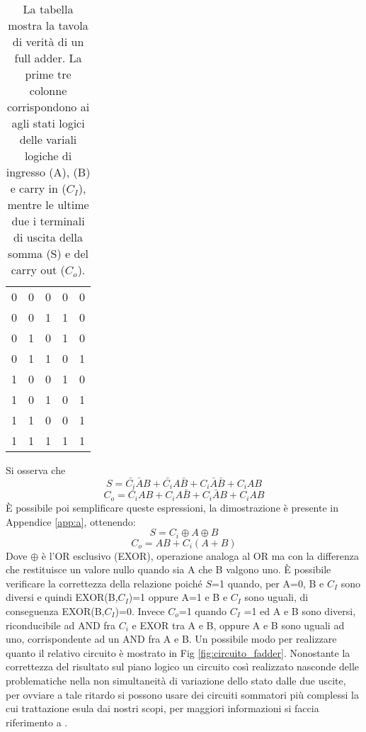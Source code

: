 \documentclass[a4paper,11pt]{article}
\begin{document}
	\begin{table}[h!]
		\centering
		\centering
		\begin{tabular}{|c|c|c|c|c|}
			\hline
			\cellcolor{yellow} \text{A} & \cellcolor{yellow} \text{B} & \cellcolor{yellow} \text{$C_I$} & \cellcolor{yellow} \text{$S$} & \cellcolor{yellow} \text{$C_o$} \\
			\hline
			0 & 0 & 0 & 0 & 0 \\
			0 & 0 & 1 & 1 & 0 \\
			0 & 1 & 0 & 1 & 0 \\
			0 & 1 & 1 & 0 & 1 \\
			1 & 0 & 0 & 1 & 0 \\
			1 & 0 & 1 & 0 & 1 \\
			1 & 1 & 0 & 0 & 1 \\
			1 & 1 & 1 & 1 & 1 \\
			\hline
		\end{tabular}
		\caption{La tabella mostra la tavola di verità di un full adder. La prime tre colonne corrispondono ai agli stati logici delle variali logiche di ingresso (A), (B) e  carry in ($C_I$), mentre le ultime due i terminali di uscita della somma (S) e del carry out ($C_o$). }
		\label{tab:full_adder}
	\end{table}
	
	Si osserva che 
	\begin{equation}
		S= \bar{C_i}\bar{A}B +\bar{C_i}A\bar{B}+C_i\bar{A}\bar{B}+C_iAB 
	\end{equation}
	\begin{equation}
		C_o= \bar{C_i}AB +C_iA\bar{B}+C_i\bar{A}B+C_iAB 
	\end{equation}
	È possibile poi semplificare queste espressioni, la dimostrazione è presente in Appendice \ref{app:a}, ottenendo:
	\begin{equation}
		S= C_i \oplus A \oplus B 
	\end{equation}
	\begin{equation}
		C_o= AB +C_i(A+B) 
	\end{equation}
	Dove $\oplus$ è l'OR esclusivo (EXOR), operazione analoga al OR ma con la differenza che restituisce un valore nullo quando sia A che B valgono uno.
	È possibile verificare la correttezza della relazione poiché $S$=1 quando, per A=0, B e $C_I$ sono diversi e quindi EXOR(B,$C_I$)=1 oppure A=1 e B e $C_I$ sono uguali, di conseguenza EXOR(B,$C_I$)=0. Invece $C_o$=1 quando $C_I$ =1 ed A e B sono diversi, riconducibile ad AND fra $C_i$ e EXOR tra A e B, oppure A e B sono uguali ad uno, corrispondente ad un AND fra A e B. Un possibile modo per realizzare quanto il relativo circuito è mostrato in Fig \ref{fig:circuito_fadder}. Nonostante la correttezza del risultato sul piano logico un circuito così realizzato nasconde delle problematiche nella non simultaneità di variazione dello stato dalle due uscite, per ovviare a tale ritardo si possono usare dei circuiti sommatori più complessi la cui trattazione esula dai nostri scopi, per maggiori informazioni si faccia riferimento a \cite{full_Adder}.
	
\end{document}
